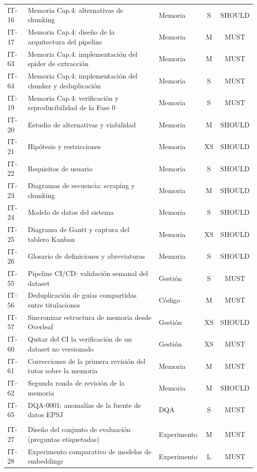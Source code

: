 \begin{xltabular}{\textwidth}{@{}l Y l c c@{}}
  IT-16 & Memoria Cap.4: alternativas de chunking & Memoria & S & SHOULD \\
  IT-17 & Memoria Cap.4: diseño de la arquitectura del pipeline & Memoria & M & MUST \\
  IT-63 & Memoria Cap.4: implementación del spider de extracción & Memoria & M & MUST \\
  IT-64 & Memoria Cap.4: implementación del chunker y deduplicación & Memoria & S & MUST \\
  IT-19 & Memoria Cap.4: verificación y reproducibilidad de la Fase 0 & Memoria & S & MUST \\
  IT-20 & Estudio de alternativas y viabilidad & Memoria & M & SHOULD \\
  IT-21 & Hipótesis y restricciones & Memoria & XS & SHOULD \\
  IT-22 & Requisitos de usuario & Memoria & S & SHOULD \\
  IT-23 & Diagramas de secuencia: scraping y chunking & Memoria & M & SHOULD \\
  IT-24 & Modelo de datos del sistema & Memoria & S & SHOULD \\
  IT-25 & Diagrama de Gantt y captura del tablero Kanban & Memoria & XS & SHOULD \\
  IT-26 & Glosario de definiciones y abreviaturas & Memoria & S & SHOULD \\
  IT-55 & Pipeline CI/CD: validación semanal del dataset & Gestión & S & MUST \\
  IT-56 & Deduplicación de guías compartidas entre titulaciones & Código & M & MUST \\
  IT-57 & Sincronizar estructura de memoria desde Overleaf & Gestión & XS & SHOULD \\
  IT-60 & Quitar del CI la verificación de un dataset no versionado & Gestión & XS & MUST \\
  IT-61 & Correcciones de la primera revisión del tutor sobre la memoria & Memoria & M & MUST \\
  IT-62 & Segunda ronda de revisión de la memoria & Memoria & M & SHOULD \\
  IT-65 & DQA-0001: anomalías de la fuente de datos EPSJ & DQA & S & MUST \\
  \addlinespace
   \\[2pt]
  IT-27 & Diseño del conjunto de evaluación (preguntas etiquetadas) & Experimento & M & MUST \\
  IT-28 & Experimento comparativo de modelos de embeddings & Experimento & L & MUST \\

\end{xltabular}
